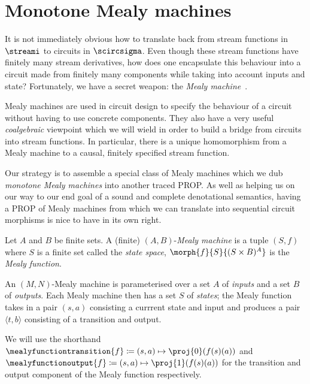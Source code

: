 \section{Monotone Mealy machines}

It is not immediately obvious how to translate back from stream functions in
\(\streami\) to circuits in \(\scircsigma\).
Even though these stream functions have finitely many stream derivatives, how
does one encapsulate this behaviour into a circuit made from finitely many
components while taking into account inputs and state?
Fortunately, we have a secret weapon: the
\emph{Mealy machine}~\cite{mealy1955method}.

Mealy machines are used in circuit design to specify the behaviour of a circuit
without having to use concrete components.  They also have
a very useful \emph{coalgebraic} viewpoint which we will wield in order to
build a bridge from circuits into stream functions.
In particular, there is a unique homomorphism from a Mealy machine to a causal,
finitely specified stream function.

Our strategy is to assemble a special class of Mealy machines which we dub
\emph{monotone Mealy machines} into another traced PROP.
As well as helping us on our way to our end goal of a sound and complete
denotational semantics, having a PROP of Mealy machines from which we can
translate into sequential circuit morphisms is nice to have in its own right.

\begin{definition}\label{def:mealy}
    Let \(A\) and \(B\) be finite sets.
    A (finite) \((A,B)\)-\emph{Mealy machine} is a tuple \((S, f)\) where
    \(S\) is a finite set called the \emph{state space},
    \(\morph{f}{S}{(S \times B)^A}\) is the \emph{Mealy function}.
\end{definition}

An \((M,N)\)-Mealy machine is parameterised over a set \(A\) of \emph{inputs} and
a set \(B\) of \emph{outputs}.
Each Mealy machine then has a set \(S\) of \emph{states}; the Mealy function
takes in a pair \((s, a)\) consisting a currrent state and input and produces a
pair \(\langle{t,b}\rangle\) consisting of a transition and output.

\begin{notation}
    We will use the shorthand \(
    \mealyfunctiontransition{f} \coloneqq (s, a) \mapsto \proj{0}(f(s)(a))
    \) and \(
    \mealyfunctionoutput{f} \coloneqq (s, a) \mapsto \proj{1}(f(s)(a))
    \) for the transition and output component of the Mealy function respectively.
\end{notation}

